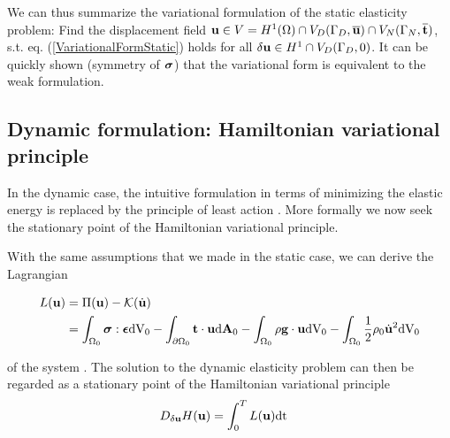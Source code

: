 We can thus summarize the variational formulation of the static elasticity problem: Find the displacement field $\mathbf {u}  \in V = {H^1(\Omega) \cap V_D(\Gamma _D,\overline{\mathbf {u} }) \cap V_N(\Gamma _N,\overline{\mathbf {t} })}$, s.t. eq. (\ref{VariationalFormStatic}) holds for all $\delta \mathbf {u}  \in {H}^1 \cap V_D(\Gamma _D,0)$. It can be quickly shown (symmetry of $\boldsymbol{\sigma}$) that the variational form is equivalent to the weak formulation. 

\subsection{Dynamic formulation: Hamiltonian variational principle}

In the dynamic case, the intuitive formulation in terms of minimizing the elastic energy is replaced by the principle of least action \cite{Ibrahimbegovic2009}. More formally we now seek the stationary point of the Hamiltonian variational principle.

With the same assumptions that we made in the static case, we can derive the Lagrangian

 \begin{alignat}{1}
L(\mathbf {u} ) &=  \Pi(\mathbf {u} ) - \mathcal K  (\dot{\mathbf {u} }) \\
&= \int _{\Omega _0}  \boldsymbol{\sigma} : \boldsymbol{\epsilon}   \textnormal{dV}_0      -  \int _{\partial \Omega _0}  \mathbf {t}  \cdot \mathbf {u}     \textnormal{d}\mathbf{A}_0  -  \int _{\Omega _0}  \rho \mathbf {g}  \cdot \mathbf {u}   \textnormal{dV}_0 - \int _{\Omega _0}  \frac{1}{2} \rho_0  {\dot {\mathbf {u} }} ^2  \textnormal{dV}_0
\label{MechEnergyDynamicLinear}
\end{alignat}

of the system \cite{Holzapfel2001}. The solution to the dynamic elasticity problem can then be regarded as a stationary point of the Hamiltonian variational principle
 \begin{alignat}{1}
& D_{\delta \mathbf {u} } H (\mathbf {u} ) = \int _0 ^T L (\mathbf {u} ) \textnormal{dt}
\label{HamiltonianVariationalForm}
\end{alignat}



